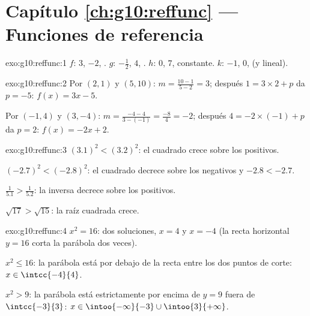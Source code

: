 \section*{Capítulo \ref{ch:g10:reffunc} --- Funciones de referencia}

\begin{solution}{exo:g10:reffunc:1}
$f$:  $3$,  $-2$, . \quad
$g$:  $-\frac12$,  $4$, . \quad
$h$:  $0$,  $7$, constante. \quad
$k$:  $-1$,  $0$,  (y lineal).
\end{solution}

\begin{solution}{exo:g10:reffunc:2}
Por $(2,1)$ y $(5,10)$:  $m = \frac{10 - 1}{5 - 2} = 3$; después
$1 = 3 \times 2 + p$ da $p = -5$: $f(x) = 3x - 5$.

Por $(-1,4)$ y $(3,-4)$:  $m = \frac{-4 - 4}{3 - (-1)} =
\frac{-8}{4} = -2$; después $4 = -2 \times (-1) + p$ da $p = 2$:
$f(x) = -2x + 2$.
\end{solution}

\begin{solution}{exo:g10:reffunc:3}
$(3.1)^2 < (3.2)^2$: el cuadrado crece sobre los positivos.

$(-2.7)^2 < (-2.8)^2$: el cuadrado decrece sobre los negativos y
$-2.8 < -2.7$.

$\frac{1}{5.1} > \frac{1}{5.2}$: la  inversa decrece sobre los
positivos.

$\sqrt{17} > \sqrt{15}$: la raíz cuadrada crece.
\end{solution}

\begin{solution}{exo:g10:reffunc:4}
$x^2 = 16$: dos soluciones, $x = 4$ y $x = -4$ (la recta horizontal
$y = 16$ corta la parábola dos veces).

$x^2 \leq 16$: la parábola está por debajo de la recta entre los dos
puntos de corte: $x \in \intcc{-4}{4}$.

$x^2 > 9$: la parábola está estrictamente por encima de $y = 9$ fuera de
$\intcc{-3}{3}$: $x \in \intoo{-\infty}{-3} \cup \intoo{3}{+\infty}$.
\end{solution}

